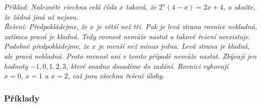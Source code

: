 \documentclass[12pt,a4paper]{report}
\begin{document}
\textit{Příklad: Nalezněte všechna celá čísla $x$ taková, že $2
	^x(4 - x) = 2x + 4$, a ukažte, že žádná jiná už nejsou. \\Řešení: Předpokládejme, že $x$ je větší než tři. Pak je levá strana rovnice nekladná, zatímco pravá je
	kladná. Tedy rovnost nemůže nastat a takové řešení neexistuje.
	Podobně předpokládejme, že $x$ je menší než minus jedna. Levá strana je kladná, ale pravá
	nekladná. Proto rovnost ani v tomto případě nemůže nastat.
	Zbývají jen hodnoty $-1, 0, 1, 2, 3$, které snadno dosadíme do zadání. Rovnici vyhovují $x = 0,\,x = 1$ a $x = 2$, což jsou všechna řešení úlohy.}

\subsubsection*{Příklady}		
\begin{enumerate}


\end{enumerate}
\end{document}
